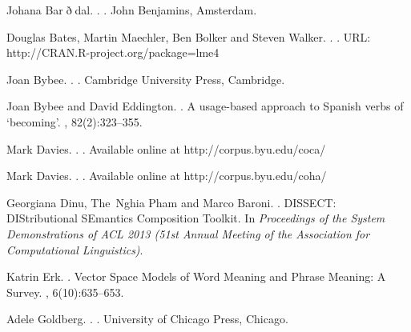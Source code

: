 \documentclass[11pt]{article}
\begin{document}
%


\begin{thebibliography}{}

Johana Bar$\eth$dal.
.
.
\newblock John Benjamins, Amsterdam.

Douglas Bates, Martin Maechler, Ben Bolker and Steven Walker.
.
.
\newblock URL: http://CRAN.R-project.org/package=lme4

Joan Bybee.
.
.
\newblock Cambridge University Press, Cambridge.

Joan Bybee and David Eddington.
.
\newblock A usage-based approach to {S}panish verbs of `becoming'.
, 82(2):323--355.

Mark Davies.
.
.
\newblock Available online at http://corpus.byu.edu/coca/

Mark Davies.
.
.
\newblock Available online at http://corpus.byu.edu/coha/

Georgiana Dinu, The~Nghia Pham and Marco Baroni.
.
\newblock DISSECT: DIStributional SEmantics Composition Toolkit.
\newblock In {\em Proceedings of the System Demonstrations of ACL 2013 (51st Annual Meeting of the Association for Computational Linguistics)}.

Katrin Erk.
.
\newblock Vector Space Models of Word Meaning and Phrase Meaning: A Survey.
, 6(10):635--653.

Adele Goldberg.
.
.
\newblock University of Chicago Press, Chicago.


\end{thebibliography}
\end{document}
